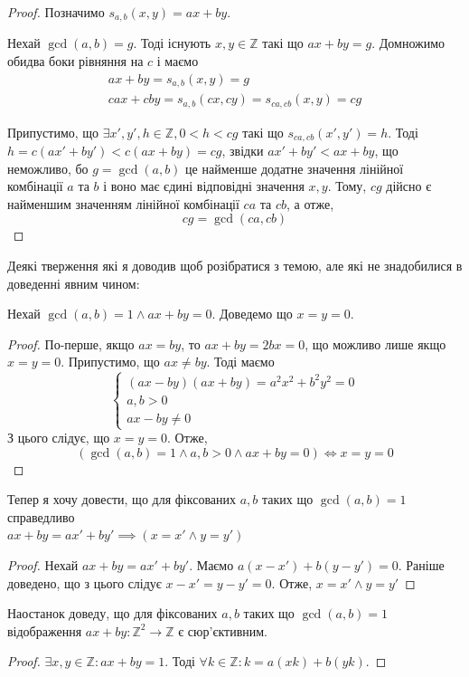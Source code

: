 \documentclass[11pt, a4paper]{article} %
\newcommand{\Z}{\mathbb{Z}}
\begin{document}
\begin{proof}
Позначимо $s_{a,b}(x,y) = ax+by$. 

Нехай $\gcd(a,b) = g$. 
Тоді існують $x,y\in\Z$ такі що $ax+by=g$.
Домножимо обидва боки рівняння на $c$ і маємо 
\begin{gather*}
    ax+by = s_{a,b}(x,y) = g\\
    cax+cby = s_{a,b}(cx,cy) = s_{ca,cb}(x,y) = cg
\end{gather*}

Припустимо, що $\exists x',y',h\in\Z, 0<h<cg$ такі що $s_{ca,cb}(x',y')=h$.
Тоді $h = c(ax'+by') < c(ax+by) = cg$, звідки $ax'+by' < ax+by$, що неможливо, бо $g=\gcd(a,b)$ 
це найменше додатне значення лінійної комбінації $a$ та $b$ і воно має єдині відповідні значення $x,y$.
Тому, $cg$ дійсно є найменшим значенням лінійної комбінації $ca$ та $cb$, а отже, 
\[cg = \gcd(ca,cb)\]
\end{proof}

Деякі тверження які я доводив щоб розібратися з темою, але які не знадобилися в доведенні явним чином:

\begin{mdframed}
Нехай $\gcd(a,b)=1 \land ax+by=0$. Доведемо що $x=y=0$.
\begin{proof}
    По-перше, якщо $ax = by$, то $ax+by=2bx=0$, що можливо лише якщо $x=y=0$.
    Припустимо, що $ax \ne by$. Тоді маємо
    \[
    \begin{cases}
    (ax-by)(ax+by) = a^2x^2 + b^2y^2 = 0\\
    a,b>0\\
    ax-by \ne 0
    \end{cases}
    \]
    З цього слідує, що $x=y=0$.
    Отже, 
    \[\left(\gcd(a,b)=1 \land a,b>0 \land ax+by = 0\right) \iff x=y=0\]
\end{proof}
\end{mdframed}

\begin{mdframed}
    Тепер я хочу довести, що для фіксованих $a,b$ таких що $\gcd(a,b)=1$ справедливо \\
    $ax+by=ax'+by' \implies \left(x=x' \land y=y'\right)$
    \begin{proof}
        Нехай $ax+by = ax'+by'$.
        Маємо $a(x-x') + b(y-y')=0$. Раніше доведено, що з цього слідує $x-x'=y-y'=0$.
        Отже, $x=x' \land y=y'$
    \end{proof}
\end{mdframed}

\begin{mdframed}
    Наостанок доведу, що для фіксованих $a,b$ таких що $\gcd(a,b)=1$ \\
    відображення
    $ax+by : \Z^2 \to \Z$ є сюр'єктивним.
    \begin{proof}
        $\exists x,y\in\Z: ax+by=1$. Тоді $\forall k\in\Z: k=a(xk)+b(yk)$.
    \end{proof}
\end{mdframed}
\end{document}
